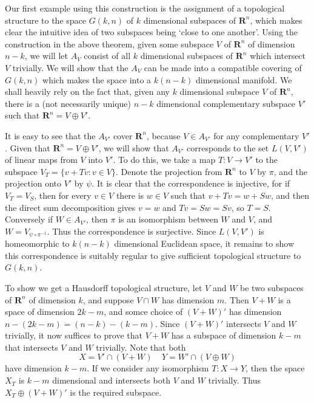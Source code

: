 \begin{example}[Grassmannian]
Our first example using this construction is the assignment of a topological structure to the space $G(k,n)$ of $k$ dimensional subspaces of $\mathbf{R}^n$, which makes clear the intuitive idea of two subspaces being `close to one another'. Using the construction in the above theorem, given some subspace $V$ of $\mathbf{R}^n$ of dimension $n - k$, we will let $A_V$ consist of all $k$ dimensional subspaces of $\mathbf{R}^n$ which intersect $V$ trivially. We will show that the $A_V$ can be made into a compatible covering of $G(k,n)$ which makes the space into a $k(n-k)$ dimensional manifold. We shall heavily rely on the fact that, given any $k$ dimensional subspace $V$ of $\mathbf{R}^n$, there is a (not necessarily unique) $n-k$ dimensional complementary subspace $V'$ such that $\mathbf{R}^n = V \oplus V'$.

It is easy to see that the $A_{V'}$ cover $\mathbf{R}^n$, because $V \in A_{V'}$ for any complementary $V'$. Given that $\mathbf{R}^n = V \oplus V'$, we will show that $A_{V'}$ corresponds to the set $L(V,V')$ of linear maps from $V$ into $V'$. To do this, we take a map $T: V \to V'$ to the subspace $V_T = \{ v + Tv : v \in V \}$. Denote the projection from $\mathbf{R}^n$ to $V$ by $\pi$, and the projection onto $V'$ by $\psi$. It is clear that the correspondence is injective, for if $V_T = V_S$, then for every $v \in V$ there is $w \in V$ such that $v + Tv = w + Sw$, and then the direct sum decomposition gives $v = w$ and $Tv = Sw = Sv$, so $T = S$. Conversely if $W \in A_{V'}$, then $\pi$ is an isomorphism between $W$ and $V$, and $W = V_{\psi \circ \pi^{-1}}$. Thus the correspondence is surjective. Since $L(V,V')$ is homeomorphic to $k(n-k)$ dimensional Euclidean space, it remains to show this correspondence is suitably regular to give sufficient topological structure to $G(k,n)$.

To show we get a Hausdorff topological structure, let $V$ and $W$ be two subspaces of $\mathbf{R}^n$ of dimension $k$, and suppose $V \cap W$ has dimension $m$. Then $V + W$ is a space of dimension $2k - m$, and somce choice of $(V + W)'$ has dimension $n - (2k - m) = (n - k) - (k-m)$. Since $(V+W)'$ intersects $V$ and $W$ trivially, it now suffices to prove that $V+W$ has a subspace of dimension $k - m$ that intersects $V$ and $W$ trivially. Note that both
%
\[ X = V' \cap (V + W)\ \ \ \ \ Y = W' \cap (V \oplus W) \]
%
have dimension $k - m$. If we consider any isomorphism $T: X \to Y$, then the space $X_T$ is $k-m$ dimensional and intersects both $V$ and $W$ trivially. Thus $X_T \oplus (V + W)'$ is the required subspace.


\end{example}
